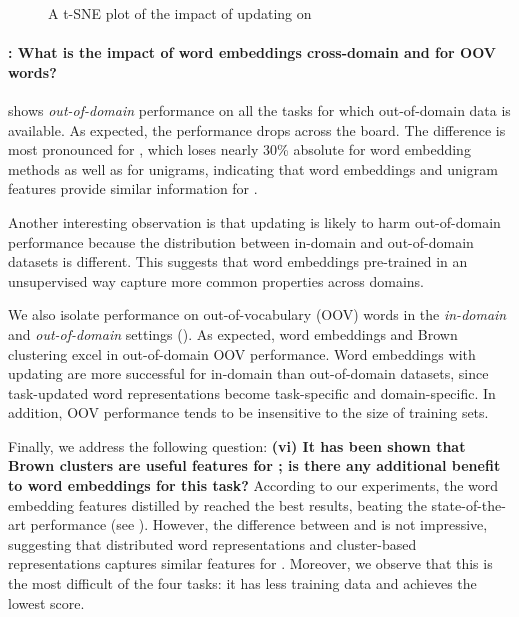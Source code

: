 \begin{figure}[t!]
\begin{subfigure}[b]{0.48\textwidth}
	\subcaption{\ner}
	\label{fig:skippos}	
\end{subfigure}
\caption{A t-SNE plot of the impact of updating on \Skipgram}
\label{fig:vectorfield}
\end{figure}


\paragraph{\RQ[4]: What is the impact of word embeddings cross-domain
  and for OOV words?}
 shows \textit{out-of-domain} performance on all the tasks for which out-of-domain data is available.
As expected, the performance drops across the board. The difference is most pronounced for \chunking, which loses nearly 30\% absolute for word embedding methods as well as for unigrams, 
indicating that word embeddings and unigram features provide similar information 
for \chunking. 


Another interesting observation is that updating is likely to harm out-of-domain performance because the distribution between in-domain and out-of-domain datasets is different. This suggests that word embeddings pre-trained in an unsupervised way capture more common properties across domains. 


We also isolate performance on out-of-vocabulary (OOV) words 
in the \textit{in-domain} and \textit{out-of-domain} settings ().
As expected, word embeddings and Brown clustering excel in out-of-domain OOV performance.
Word embeddings with updating are more successful for 
in-domain than out-of-domain datasets, since task-updated
word representations become task-specific and domain-specific. 
In addition, OOV performance tends to be insensitive to the size of training sets.

Finally, we address the following question: \textbf{(vi) It has been shown that Brown clusters are useful features for \mwe; is there any additional benefit to word embeddings for this task?} 
According to our experiments, the word embedding features distilled by \CW[\withup] reached the best results, beating the state-of-the-art performance (see ).
However, the difference between \brown and \CW[\withup] is not impressive, suggesting that distributed word representations and cluster-based representations captures similar features for \mwe. Moreover, we observe that this is the most difficult of the four tasks: it has less training data and achieves the lowest score.


